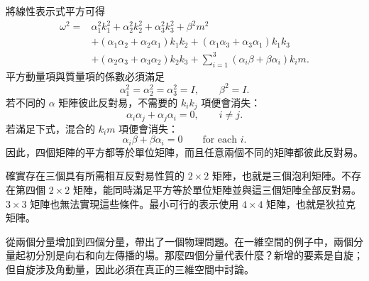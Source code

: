 將線性表示式平方可得
\begin{align}
\omega^2
={}&
\alpha_1^2k_1^2+\alpha_2^2k_2^2+\alpha_3^2k_3^2+\beta^2m^2
\nonumber\\
&+(\alpha_1\alpha_2+\alpha_2\alpha_1)k_1k_2
+(\alpha_1\alpha_3+\alpha_3\alpha_1)k_1k_3
\nonumber\\
&+(\alpha_2\alpha_3+\alpha_3\alpha_2)k_2k_3
+\sum_{i=1}^{3}(\alpha_i\beta+\beta\alpha_i)k_i m.
\end{align}
平方動量項與質量項的係數必須滿足
\begin{equation}
\alpha_1^2=\alpha_2^2=\alpha_3^2=I,
\qquad
\beta^2=I.
\end{equation}
若不同的 \(\alpha\) 矩陣彼此反對易，不需要的 \(k_i k_j\) 項便會消失：
\begin{equation}
\alpha_i\alpha_j+\alpha_j\alpha_i=0,
\qquad i\neq j.
\end{equation}
若滿足下式，混合的 \(k_i m\) 項便會消失：
\begin{equation}
\alpha_i\beta+\beta\alpha_i=0
\qquad
\text{for each }i.
\end{equation}
因此，四個矩陣的平方都等於單位矩陣，而且任意兩個不同的矩陣都彼此反對易。

確實存在三個具有所需相互反對易性質的 \(2\times2\) 矩陣，也就是三個泡利矩陣。不存在第四個 \(2\times2\) 矩陣，能同時滿足平方等於單位矩陣並與這三個矩陣全部反對易。\(3\times3\) 矩陣也無法實現這些條件。最小可行的表示使用 \(4\times4\) 矩陣，也就是狄拉克矩陣。

從兩個分量增加到四個分量，帶出了一個物理問題。在一維空間的例子中，兩個分量起初分別是向右和向左傳播的場。那麼四個分量代表什麼？新增的要素是自旋；但自旋涉及角動量，因此必須在真正的三維空間中討論。


